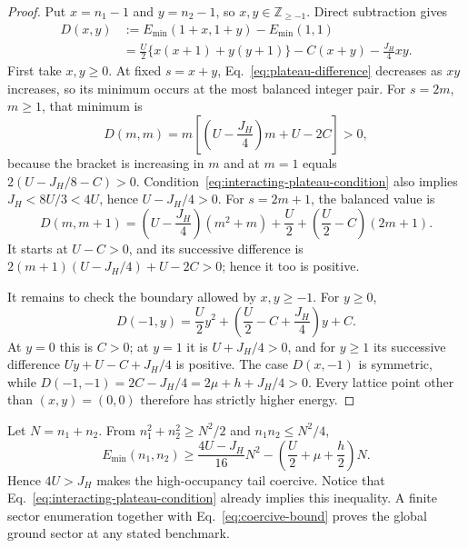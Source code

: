 \documentclass[11pt]{article}
\theoremstyle{definition}
\theoremstyle{remark}
\begin{document}
\begin{proof}
Put \(x=n_1-1\) and \(y=n_2-1\), so \(x,y\in\mathbb Z_{\ge-1}\).  Direct
subtraction gives
\begin{equation}
 \begin{split}
 D(x,y)&:=E_{\min}(1+x,1+y)-E_{\min}(1,1)\\
 &=\frac U2\{x(x+1)+y(y+1)\}-C(x+y)-\frac{J_H}{4}xy.
 \end{split}
 \label{eq:plateau-difference}
\end{equation}
First take \(x,y\ge0\).  At fixed \(s=x+y\), Eq.~\eqref{eq:plateau-difference}
decreases as \(xy\) increases, so its minimum occurs at the most balanced
integer pair.  For \(s=2m\), \(m\ge1\), that minimum is
\begin{equation}
 D(m,m)=m\left[\left(U-\frac{J_H}{4}\right)m+U-2C\right]>0,
\end{equation}
because the bracket is increasing in \(m\) and at \(m=1\) equals
\(2(U-J_H/8-C)>0\).  Condition~\eqref{eq:interacting-plateau-condition}
also implies \(J_H<8U/3<4U\), hence \(U-J_H/4>0\).  For \(s=2m+1\), the
balanced value is
\begin{equation}
 D(m,m+1)=\left(U-\frac{J_H}{4}\right)(m^2+m)
 +\frac U2+\left(\frac U2-C\right)(2m+1).
\end{equation}
It starts at \(U-C>0\), and its successive difference is
\(2(m+1)(U-J_H/4)+U-2C>0\); hence it too is positive.

It remains to check the boundary allowed by \(x,y\ge-1\).  For \(y\ge0\),
\begin{equation}
 D(-1,y)=\frac U2y^2+\left(\frac U2-C+\frac{J_H}{4}\right)y+C.
\end{equation}
At \(y=0\) this is \(C>0\); at \(y=1\) it is \(U+J_H/4>0\), and for
\(y\ge1\) its successive difference
\(Uy+U-C+J_H/4\) is positive.  The case \(D(x,-1)\) is symmetric, while
\(D(-1,-1)=2C-J_H/4=2\mu+h+J_H/4>0\).  Every lattice point other than
\((x,y)=(0,0)\) therefore has strictly higher energy.
\end{proof}

Let \(N=n_1+n_2\).  From
\(n_1^2+n_2^2\ge N^2/2\) and \(n_1n_2\le N^2/4\),
\begin{equation}
 \boxed{
 E_{\min}(n_1,n_2)\ge
 \frac{4U-J_H}{16}N^2
 -\left(\frac U2+\mu+\frac h2\right)N.}
 \label{eq:coercive-bound}
\end{equation}
Hence \(4U>J_H\) makes the high-occupancy tail coercive.  Notice that
Eq.~\eqref{eq:interacting-plateau-condition} already implies this inequality.
A finite sector
enumeration together with Eq.~\eqref{eq:coercive-bound} proves the global
ground sector at any stated benchmark.
\end{document}
